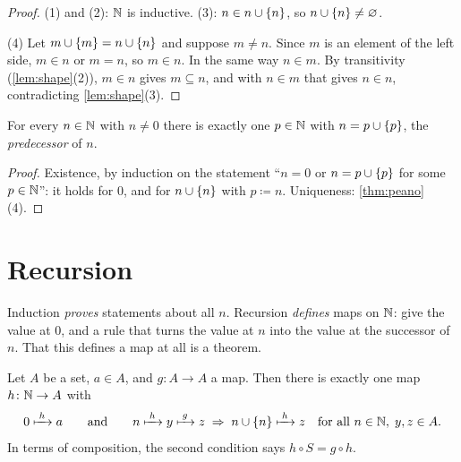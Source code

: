 \begin{proof}
(1) and (2): $\mathbb{N}$ is inductive. (3): $n \in n \cup \lbrace n \rbrace$, so $n \cup \lbrace n \rbrace
\neq \varnothing$.

(4) Let $m \cup \lbrace m \rbrace = n \cup \lbrace n \rbrace$ and suppose $m \neq n$. Since $m$ is an
element of the left side, $m \in n$ or $m = n$, so $m \in n$. In the same way $n
\in m$. By transitivity (\cref{lem:shape}(2)), $m \in n$ gives $m \subseteq n$,
and with $n \in m$ that gives $n \in n$, contradicting \cref{lem:shape}(3).
\end{proof}

\begin{corollary}[Predecessor]
\label{cor:predecessor}
For every $n \in \mathbb{N}$ with $n \neq 0$ there is exactly one $p \in \mathbb{N}$ with $n = p
\cup \lbrace p \rbrace$, the \emph{predecessor} of $n$.
\end{corollary}

\begin{proof}
Existence, by induction on the statement \enquote{$n = 0$ or $n = p \cup \lbrace p \rbrace$
for some $p \in \mathbb{N}$}: it holds for $0$, and for $n \cup \lbrace n \rbrace$ with $p \coloneqq
n$. Uniqueness: \cref{thm:peano}(4).
\end{proof}

\section{Recursion}

Induction \emph{proves} statements about all $n$. Recursion \emph{defines} maps on
$\mathbb{N}$: give the value at $0$, and a rule that turns the value at $n$ into the value
at the successor of $n$. That this defines a map at all is a theorem.

\begin{theorem}
\label{thm:recursion}
Let $A$ be a set, $a \in A$, and $g \colon A \to A$ a map. Then there is exactly
one map $h \colon \mathbb{N} \to A$ with
\[
  0 \xmapsto{\;h\;} a \qquad\text{and}\qquad n \xmapsto{\;h\;} y \xmapsto{\;g\;} z \;\Rightarrow\; n \cup
  \lbrace n \rbrace \xmapsto{\;h\;} z \quad \text{for all } n \in \mathbb{N},\; y, z \in A.
\]
In terms of composition, the second condition says $h \circ S = g \circ h$.
\end{theorem}

